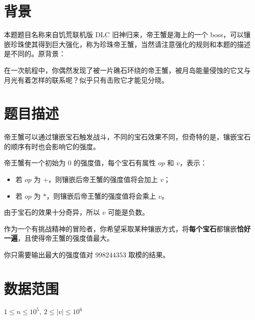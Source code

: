 \documentclass[a4paper,10pt]{article}
\begin{document}
\newpage

\section*{背景}

本题题目名称来自饥荒联机版 DLC 旧神归来，帝王蟹是海上的一个 boss，可以镶嵌珍珠使其得到巨大强化，称为珍珠帝王蟹，当然请注意强化的规则和本题的描述是不同的。原背景：

在一次航程中，你偶然发现了被一片礁石环绕的帝王蟹，被月岛能量侵蚀的它又与月光有着怎样的联系呢？似乎只有击败它才能见分晓。

\section*{题目描述}

帝王蟹可以通过镶嵌宝石触发战斗，不同的宝石效果不同，但奇特的是，镶嵌宝石的顺序有时也会影响它的强度。

帝王蟹有一个初始为 $0$ 的强度值，每个宝石有属性 $op$ 和 $v$，表示：

\begin{itemize}
\item 若 $op$ 为 $\texttt{+}$，则镶嵌后帝王蟹的强度值将会加上 $v$；

\item 若 $op$ 为 $\texttt{*}$，则镶嵌后帝王蟹的强度值将会乘上 $v$。
\end{itemize}

由于宝石的效果十分奇异，所以 $v$ 可能是负数。

作为一个有挑战精神的冒险者，你希望采取某种镶嵌方式，将\textbf{每个宝石}都镶嵌\textbf{恰好一遍}，且使得帝王蟹的强度值最大。

你只需要输出最大的强度值对 $998244353$ 取模的结果。

\section*{数据范围}

$1\leq n\leq 10^5,\ 2\leq |v|\leq 10^6$

\newpage
\end{document}
